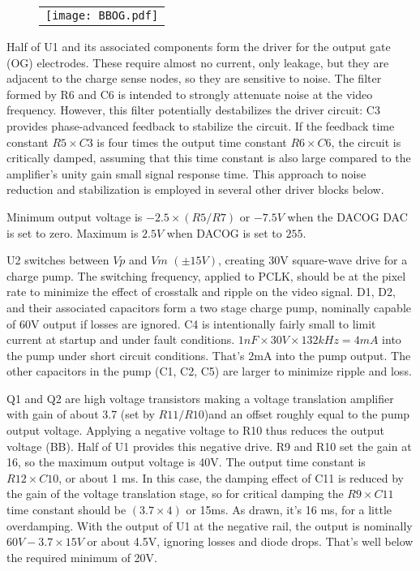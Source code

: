 \documentclass[a4paper,12pt]{article}
\begin{document}
   \begin{figure}
   \begin{center}
   \begin{tabular}{c}
   \texttt{[image: BBOG.pdf]}
   \end{tabular}
   \end{center}
   \end{figure}
Half of U1 and its associated components form the driver for the output gate (OG) electrodes. These require almost no current, only leakage, but they are adjacent to the charge sense nodes, so they are sensitive to noise. The filter formed by R6 and C6 is intended to strongly attenuate noise at the video frequency. However, this filter potentially destabilizes the driver circuit: C3 provides phase-advanced feedback to stabilize the circuit. If the feedback time constant $R5\times C3$ is four times the output time constant $R6\times C6$, the circuit is critically damped, assuming that this time constant is also large compared to the amplifier's unity gain small signal response time. This approach to noise reduction and stabilization is employed in several other driver blocks below.

Minimum output voltage is $-2.5\times(R5/R7)$ or $-7.5V$ when the DACOG DAC is set to zero. Maximum is $2.5V$ when DACOG is set to $255$.

U2 switches between $Vp$ and $Vm$ $(\pm15V)$, creating 30V square-wave drive for a charge pump. The switching frequency, applied to PCLK, should be at the pixel rate to minimize the effect of crosstalk and ripple on the video signal. D1, D2, and their associated capacitors form a two stage charge pump, nominally capable of 60V output if losses are ignored. C4 is intentionally fairly small to limit current at startup and under fault conditions. $1nF\times30V\times132kHz=4mA$ into the pump under short circuit conditions. That's 2mA into the pump output.
The other capacitors in the pump (C1, C2, C5) are larger to minimize ripple and loss.

Q1 and Q2 are high voltage transistors making a voltage translation amplifier with gain of about 3.7 (set by $R11/R10$)and an offset roughly equal to the pump output voltage. Applying a negative voltage to R10 thus reduces the output voltage (BB). Half of U1 provides this negative drive. R9 and R10 set the gain at 16, so the maximum output voltage is 40V. The output time constant is $R12\times C10$, or about 1 ms. In this case, the damping effect of C11 is reduced by the gain of the voltage translation stage, so for critical damping the $R9\times C11$ time constant should be $(3.7\times4)$ or 15ms. As drawn, it's 16 ms, for a little overdamping. With the output of U1 at the negative rail, the output is nominally $60V-3.7\times15V$ or about 4.5V, ignoring losses and diode drops. That's well below the required minimum of 20V.
\end{document}
